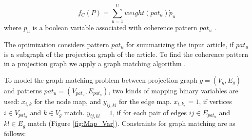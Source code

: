 \begin{equation}
f_C(P) = \sum_{u=1}^{U}{weight(pat_u) \dot p_u}
\end{equation}
where $p_u$ is a boolean variable associated with coherence pattern $pat_u$ .

The optimization considers pattern $pat_{u}$ for summarizing the input article, if $pat_{u}$ is a subgraph of the projection graph of the article. To find the coherence pattern in a projection graph we apply a graph matching algorithm \cite{lerouge15}.

%
%

To model the graph matching problem between projection graph $g=(V_{g},E_{g})$ and patterns $pat_{u}=(V_{pat_{u}},E_{pat_{u}})$, two kinds of mapping binary variables are used: $x_{i,k}$ for the node map, and $y_{ij,kl}$ for the edge map. $x_{i,k,}=1$, if vertices $i\in V_{pat_{u}}$ and $k\in V_g$ match. $y_{ij,kl}=1$, if for each pair of edges $ij \in E_{pat_{u}}$ and $kl \in E_g$ match (Figure \ref{fig:Map_Var}).
Constraints for graph matching are as follows:

